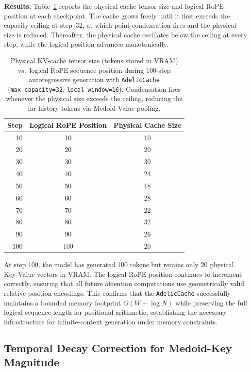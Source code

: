 \documentclass[11pt,a4paper]{article}
\begin{document}
\textbf{Results.} Table~\ref{tab:kv_cache} reports the physical cache tensor size and logical RoPE position at each checkpoint. The cache grows freely until it first exceeds the capacity ceiling at step~32, at which point condensation fires and the physical size is reduced. Thereafter, the physical cache oscillates below the ceiling at every step, while the logical position advances monotonically.

\begin{table}[h]
\centering
\caption{Physical KV-cache tensor size (tokens stored in VRAM) vs.\ logical RoPE sequence position during 100-step autoregressive generation with \texttt{AdelicCache} (\texttt{max\_capacity=32}, \texttt{local\_window=16}). Condensation fires whenever the physical size exceeds the ceiling, reducing the far-history tokens via Medoid-Value pooling.}
\label{tab:kv_cache}
\begin{tabular}{@{}rcc@{}}
\toprule
Step & Logical RoPE Position & Physical Cache Size \\
\midrule
10  & 10  & 10 \\
20  & 20  & 20 \\
30  & 30  & 30 \\
40  & 40  & 24 \\
50  & 50  & 18 \\
60  & 60  & 28 \\
70  & 70  & 22 \\
80  & 80  & 32 \\
90  & 90  & 26 \\
100 & 100 & 20 \\
\bottomrule
\end{tabular}
\end{table}

At step 100, the model has generated 100 tokens but retains only 20 physical Key-Value vectors in VRAM. The logical RoPE position continues to increment correctly, ensuring that all future attention computations use geometrically valid relative position encodings. This confirms that the \texttt{AdelicCache} successfully maintains a bounded memory footprint $O(W + \log N)$ while preserving the full logical sequence length for positional arithmetic, establishing the necessary infrastructure for infinite-context generation under memory constraints.

\subsection{Temporal Decay Correction for Medoid-Key Magnitude}
\label{sec:temporal_decay}
\end{document}

